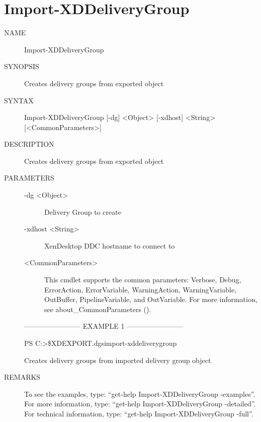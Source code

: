 \documentclass[letterpaper,10pt,english]{sphinxmanual}
\begin{document}
\section{Import-XDDeliveryGroup}
\label{\detokenize{cmd_import:import-xddeliverygroup}}\begin{description}
\item[{NAME}] \leavevmode
Import-XDDeliveryGroup

\item[{SYNOPSIS}] \leavevmode
Creates delivery groups from exported object

\item[{SYNTAX}] \leavevmode
Import-XDDeliveryGroup {[}-dg{]} \textless{}Object\textgreater{} {[}-xdhost{]} \textless{}String\textgreater{} {[}\textless{}CommonParameters\textgreater{}{]}

\item[{DESCRIPTION}] \leavevmode
Creates delivery groups from exported object

\item[{PARAMETERS}] \leavevmode\begin{description}
\item[{-dg \textless{}Object\textgreater{}}] \leavevmode
Delivery Group to create

\item[{-xdhost \textless{}String\textgreater{}}] \leavevmode
XenDesktop DDC hostname to connect to

\item[{\textless{}CommonParameters\textgreater{}}] \leavevmode
This cmdlet supports the common parameters: Verbose, Debug,
ErrorAction, ErrorVariable, WarningAction, WarningVariable,
OutBuffer, PipelineVariable, and OutVariable. For more information, see
about\_CommonParameters ().

\end{description}

————————\textendash{} EXAMPLE 1 ————————\textendash{}

PS C:\textgreater{}\$XDEXPORT.dgs\textbar{}import-xddeliverygroup

Creates delivery groups from imported delivery group object

\item[{REMARKS}] \leavevmode
To see the examples, type: “get-help Import-XDDeliveryGroup -examples”.
For more information, type: “get-help Import-XDDeliveryGroup -detailed”.
For technical information, type: “get-help Import-XDDeliveryGroup -full”.

\end{description}
\end{document}
